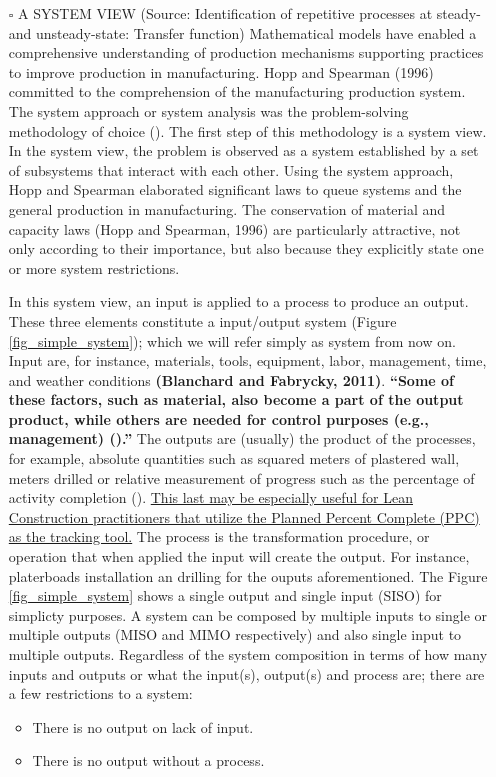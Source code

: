 \documentclass{article}
\begin{document}
\begin{itemize}
\item[{$\square$}] A SYSTEM VIEW (Source: Identification of repetitive processes at steady- and unsteady-state: Transfer function)
Mathematical models have enabled a comprehensive understanding of production mechanisms supporting practices to improve production in manufacturing.
Hopp and Spearman (1996) committed to the comprehension of the manufacturing production system.
The system approach or system analysis was the problem-solving methodology of choice (\citep{Hopp2001}).
The first step of this methodology is a system view.
In the system view, the problem is observed as a system established by a set of subsystems that interact with each other.
Using the system approach, Hopp and Spearman elaborated significant laws to queue systems and the general production in manufacturing.
The conservation of material and capacity laws (Hopp and Spearman, 1996) are particularly attractive, not only according to their importance, but also because they explicitly state one or more system restrictions.

In this system view, an input is applied to a process to produce an output.
These three elements constitute a input/output system (Figure \ref{fig_simple_system});  which we will refer simply as system from now on.
Input are, for instance, materials, tools, equipment, labor, management, time, and weather conditions \textbf{(Blanchard and Fabrycky, 2011)}.
\textbf{``Some of these factors, such as material, also become a part of the output product, while others are needed for control purposes (e.g., management) (\citep{Remold1989}).''}
The outputs are (usually) the product of the processes, for example, absolute quantities such as squared meters of plastered wall, meters drilled or relative measurement of progress such as the percentage of activity completion (\citep{Antunes2016}).
\uline{This last may be especially useful for Lean Construction practitioners that utilize the Planned Percent Complete (PPC) as the tracking tool.}
The process is the transformation procedure, or operation that when applied the input will create the output.
For instance, platerboads installation an drilling for the ouputs aforementioned.
The Figure \ref{fig_simple_system} shows a single output and single input (SISO) for simplicty purposes.
A system can be composed by multiple inputs to single or multiple outputs (MISO and MIMO respectively) and also single input to multiple outputs.
Regardless of the system composition in terms of how many inputs and outputs or what the input(s), output(s) and process are; there are a few restrictions to a system:
\begin{itemize}
\item There is no output on lack of input.
\item There is no output without a process.
\end{itemize}
\end{itemize}
\end{document}
